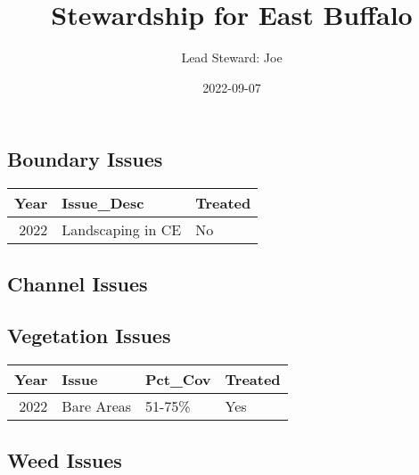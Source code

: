 \documentclass[
]{article}
\title{Stewardship for East Buffalo}
\author{Lead Steward: Joe}
\date{2022-09-07}
\begin{document}
\maketitle

\hypertarget{boundary-issues}{%
\subsection{Boundary Issues}\label{boundary-issues}}

\begin{longtable}[]{@{}rll@{}}
\toprule()
Year & Issue\_Desc & Treated \\
\midrule()
\endhead
2022 & Landscaping in CE & No \\
\bottomrule()
\end{longtable}

\hypertarget{channel-issues}{%
\subsection{Channel Issues}\label{channel-issues}}

\textbar\textbar{} \textbar\textbar{} \textbar\textbar{}
\textbar\textbar{}

\hypertarget{vegetation-issues}{%
\subsection{Vegetation Issues}\label{vegetation-issues}}

\begin{longtable}[]{@{}rlll@{}}
\toprule()
Year & Issue & Pct\_Cov & Treated \\
\midrule()
\endhead
2022 & Bare Areas & 51-75\% & Yes \\
\bottomrule()
\end{longtable}

\hypertarget{weed-issues}{%
\subsection{Weed Issues}\label{weed-issues}}
\end{document}
